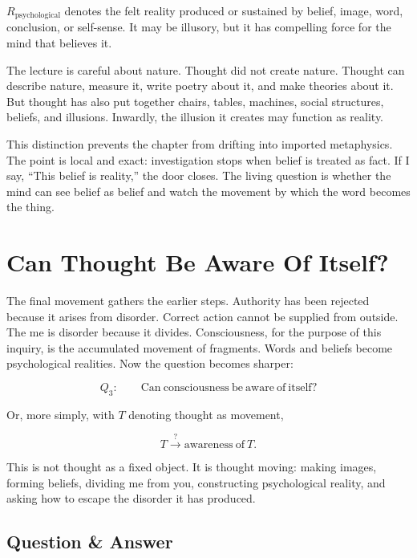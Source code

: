 \begin{definition}
\(R_{\mathrm{psychological}}\) denotes the felt reality produced or sustained by belief, image, word, conclusion, or self-sense. It may be illusory, but it has compelling force for the mind that believes it.
\end{definition}

The lecture is careful about nature. Thought did not create nature. Thought can describe nature, measure it, write poetry about it, and make theories about it. But thought has also put together chairs, tables, machines, social structures, beliefs, and illusions. Inwardly, the illusion it creates may function as reality.

This distinction prevents the chapter from drifting into imported metaphysics. The point is local and exact: investigation stops when belief is treated as fact. If I say, ``This belief is reality,'' the door closes. The living question is whether the mind can see belief as belief and watch the movement by which the word becomes the thing.

\section{Can Thought Be Aware Of Itself?}

The final movement gathers the earlier steps. Authority has been rejected because it arises from disorder. Correct action cannot be supplied from outside. The me is disorder because it divides. Consciousness, for the purpose of this inquiry, is the accumulated movement of fragments. Words and beliefs become psychological realities. Now the question becomes sharper:

\begin{equation}
Q_3:\qquad
\mathrm{Can\ consciousness\ be\ aware\ of\ itself?}
\end{equation}

Or, more simply, with \(T\) denoting thought as movement,

\begin{equation}
T \overset{?}{\longrightarrow} \mathrm{awareness\ of\ }T.
\end{equation}

This is not thought as a fixed object. It is thought moving: making images, forming beliefs, dividing me from you, constructing psychological reality, and asking how to escape the disorder it has produced.

\subsection{Question \& Answer}


